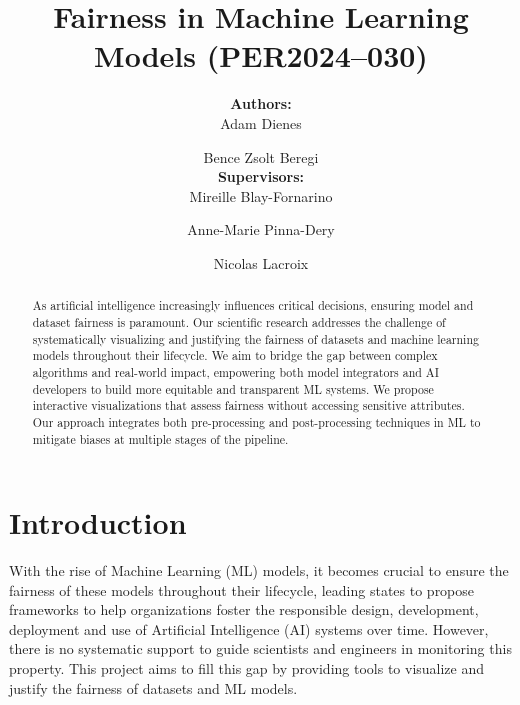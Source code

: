 \documentclass[runningheads]{llncs}
\begin{document}
%
\title{Fairness in Machine Learning Models (PER2024–030)}
\author{
    \textbf{Authors:} \\
    Adam Dienes \and 
    Bence Zsolt Beregi \\
    \textbf{Supervisors:} \\
    Mireille Blay-Fornarino \and 
    Anne-Marie Pinna-Dery \and 
    Nicolas Lacroix
}
%
%
\maketitle              %
%
\begin{abstract}
As artificial intelligence increasingly influences critical decisions, ensuring model and dataset fairness is paramount. Our scientific research addresses the challenge of systematically visualizing and justifying the fairness of datasets and machine learning models throughout their lifecycle. We aim to bridge the gap between complex algorithms and real-world impact, empowering both model integrators and AI developers to build more equitable and transparent ML systems. We propose interactive visualizations that assess fairness without accessing sensitive attributes. Our approach integrates both pre-processing and post-processing techniques in ML to mitigate biases at multiple stages of the pipeline. 

\end{abstract}
%
%
%
\section{Introduction}
With the rise of Machine Learning (ML) models, it becomes crucial to ensure the fairness of these models throughout their lifecycle, leading states to propose frameworks to help organizations foster the responsible design, development, deployment and use of Artificial Intelligence (AI) systems over time. However, there is no systematic support to guide scientists and engineers in monitoring this property. This project aims to fill this gap by providing tools to visualize and justify the fairness of datasets and ML models.
\end{document}
